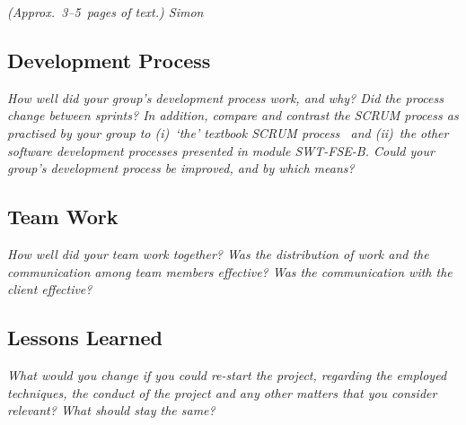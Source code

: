 \flushleft
\emph{(Approx.~3--5~pages of text.) Simon}

\subsection{Development Process}
\emph{How well did your group's development process work, and why? Did the 
process change between sprints?  In addition, compare and contrast the SCRUM 
process as practised by your group to (i)~`the' textbook SCRUM 
process~\cite{scrumbook} and (ii)~the other software development processes 
presented in module SWT-FSE-B.  Could your group's development process 
be improved, and by which means?}

\subsection{Team Work}
\emph{How well did your team work together?  Was the distribution of work and the communication among team members effective? Was the communication with the client effective?}

\subsection{Lessons Learned}
\emph{What would you change if you could re-start the project, regarding the employed techniques, the conduct of the project and any other matters that you consider relevant?  What should stay the same?}
